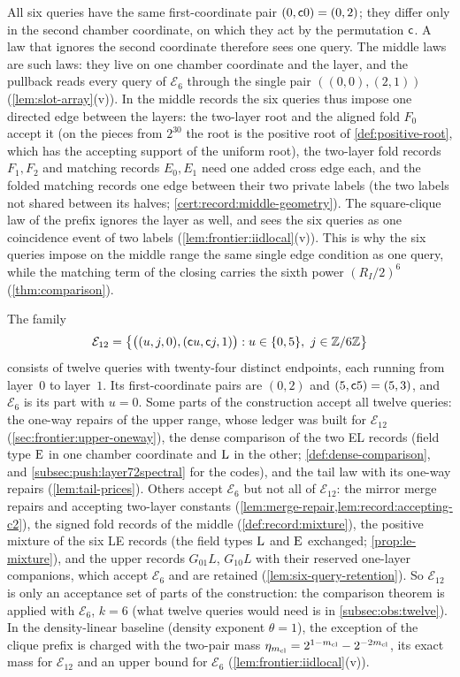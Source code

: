 All six queries have the same first-coordinate pair $(0,\mathsf c0)=(0,2)$; they
differ only in the second chamber coordinate, on which they act by the
permutation $\mathsf c$. A law that ignores the second coordinate therefore sees
one query. The middle laws are such laws: they live on one chamber coordinate
and the layer, and the pullback reads every query of $\mathcal E_6$ through
the single pair $((0,0),(2,1))$ (\cref{lem:slot-array}(v)). In the middle
records the six queries thus impose one directed edge between the layers: the
two-layer root and the aligned fold $F_0$ accept it (on the pieces from
$2^{30}$ the root is the positive root of \cref{def:positive-root}, which has
the accepting support of the uniform root), the two-layer fold records
$F_1,F_2$ and matching records $E_0,E_1$ need one added cross edge each, and
the folded matching records one edge between their two private labels (the two labels not shared
between its halves; \cref{cert:record:middle-geometry}). The square-clique law of the prefix
ignores the layer as well, and sees the six queries as one coincidence event
of two labels (\cref{lem:frontier:iidlocal}(v)). This is why the six queries
impose on the middle range the same single edge condition as one query,
while the matching term of the closing
carries the sixth power $(R_I/2)^6$ (\cref{thm:comparison}).

\begin{remark}\label{subsec:front12:construction}
The family
\[
 \mathcal E_{12}=\bigl\{\bigl((u,j,0),(\mathsf c u,\mathsf c j,1)\bigr):u\in\{0,5\},\
 j\in\mathbb Z/6\mathbb Z\bigr\}
\]
consists of twelve queries with twenty-four distinct endpoints, each running
from layer~$0$ to layer~$1$. Its first-coordinate pairs are $(0,2)$ and
$(5,\mathsf c5)=(5,3)$, and $\mathcal E_6$ is its part with $u=0$. Some parts of the
construction accept all twelve queries: the one-way repairs of
the upper range, whose ledger was built for $\mathcal E_{12}$
(\cref{sec:frontier:upper-oneway}), the dense comparison of the two EL records (field type ${\rm E}$ in one
chamber coordinate and ${\rm L}$ in the other; \cref{def:dense-comparison},
and \cref{subsec:push:layer72spectral} for the codes), and the tail law with its one-way repairs
(\cref{lem:tail-prices}). Others accept $\mathcal E_6$ but not all of
$\mathcal E_{12}$: the mirror merge repairs and accepting two-layer
constants (\cref{lem:merge-repair,lem:record:accepting-c2}),
the signed fold records of the middle (\cref{def:record:mixture}), the positive mixture of the six LE records (the field types
${\rm L}$ and ${\rm E}$ exchanged; \cref{prop:le-mixture}), and the upper records $G_{01}L$, $G_{10}L$ with their
reserved one-layer companions, which accept $\mathcal E_6$ and are retained
(\cref{lem:six-query-retention}). So $\mathcal E_{12}$ is only an acceptance set
of parts of the construction: the comparison theorem is applied with
$\mathcal E_6$, $k=6$ (what twelve queries would need is in
\cref{subsec:obs:twelve}). In the density-linear baseline (density exponent $\theta=1$), the exception of the clique prefix is
charged with the two-pair mass $\eta_{m_{\mathrm{cl}}}=2^{1-m_{\mathrm{cl}}}-2^{-2m_{\mathrm{cl}}}$, its exact
mass for $\mathcal E_{12}$ and an upper bound for $\mathcal E_6$
(\cref{lem:frontier:iidlocal}(v)).
\end{remark}


